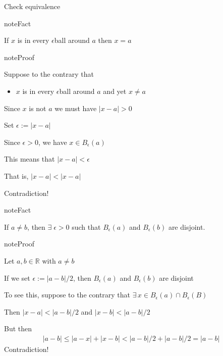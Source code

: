 \documentclass[letterpaper,10pt,english]{jupyterBook}
\begin{document}
\sphinxAtStartPar
{} Check equivalence

\begin{sphinxadmonition}{note}{Fact}

\sphinxAtStartPar
If \(x\) is in every \(\epsilon\)\sphinxhyphen{}ball around \(a\) then \(x=a\)
\end{sphinxadmonition}

\begin{sphinxadmonition}{note}{Proof}

\sphinxAtStartPar
Suppose to the contrary that
\begin{itemize}
\item {} 
\sphinxAtStartPar
\(x\) is in every \(\epsilon\)\sphinxhyphen{}ball around \(a\) and yet \(x \ne a\)

\end{itemize}

\sphinxAtStartPar
Since \(x\) is not \(a\) we must have \(|x-a| > 0\)

\sphinxAtStartPar
Set \(\epsilon := |x-a|\)

\sphinxAtStartPar
Since \(\epsilon > 0\), we have \(x \in B_{\epsilon}(a)\)

\sphinxAtStartPar
This means that \(|x-a| < \epsilon\)

\sphinxAtStartPar
That is, \(|x - a| < |x - a|\)

\sphinxAtStartPar
Contradiction!
\end{sphinxadmonition}

\begin{sphinxadmonition}{note}{Fact}

\sphinxAtStartPar
If \(a \ne b\), then \(\exists \; \epsilon > 0\) such that \(B_{\epsilon}(a)\) and \(B_{\epsilon}(b)\) are disjoint.
\end{sphinxadmonition}

\begin{figure}[htbp]
\centering

\noindent{}
\end{figure}

\begin{sphinxadmonition}{note}{Proof}

\sphinxAtStartPar
Let \(a, b \in \mathbb{R}\) with \(a \ne b\)

\sphinxAtStartPar
If we set \(\epsilon := |a-b|/2\), then \(B_{\epsilon}(a)\) and
\(B_\epsilon(b)\) are disjoint

\sphinxAtStartPar
To see this, suppose to the contrary that \(\exists \, x \in B_{\epsilon}(a) \cap B_\epsilon(B)\)

\sphinxAtStartPar
Then \( |x - a| < |a -b|/2\) and \(|x - b| < |a -b|/2\)

\sphinxAtStartPar
But then
\begin{equation*}
\begin{split}
|a - b| \leq |a - x| + |x - b| < |a -b|/2 + |a -b|/2 = |a-b|
\end{split}
\end{equation*}
\sphinxAtStartPar
Contradiction!
\end{sphinxadmonition}
\end{document}
